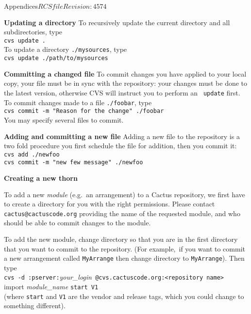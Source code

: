 \begin{cactuspart}{Appendices}{$RCSfile$}{$Revision: 4574 $}
\begin{description}
\item\textbf{Updating a directory}\newline
To recursively update the current directory and all subdirectories,
type\\
{\tt cvs update .}\\
To update a directory {\tt ./mysources}, type\\
{\tt cvs update ./path/to/mysources}

\item\textbf{Committing a changed file}\newline
To commit changes you have applied to your local copy, your file must be in
sync with the repository: your changes must be done to the
latest version, otherwise CVS will instruct you to perform an {\tt
update} first. To commit changes made to a file {\tt ./foobar}, type\\
{\tt cvs commit -m "Reason for the change" ./foobar}\\
You may specify several files to commit.

\item\textbf{Adding and committing a new file}\newline
Adding a new file to the repository is a two fold procedure you first
schedule the file for addition, then you commit it:\\
{\tt cvs add ./newfoo}\\
{\tt cvs commit -m "new few message" ./newfoo}

\item\textbf{Creating a new thorn}\newline

To add a new \textit{module} (e.g.\ an arrangement) to a Cactus repository, we
first have to create a directory for you with the right permissions.
Please contact {\tt cactus@cactuscode.org} providing the name of the
requested module, and who should be able to commit changes to the module.

To add the new module, change directory so that you are in the first directory
that you want to commit to the repository. (For example,\ if you want to commit
a new arrangement called {\tt MyArrange} then change directory to
{\tt MyArrange}). Then type\\
{\tt cvs -d :pserver:}\textit{your\_login}{\tt
@cvs.cactuscode.org:<repository name> } import \textit{module\_name} {\tt start V1}\\
(where {\tt start} and {\tt V1} are the vendor and release tags, which you could change to something different).


\end{description}
\end{cactuspart}
